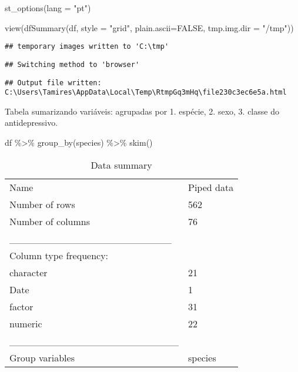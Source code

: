 \documentclass[
]{article}
\newenvironment{Shaded}{\begin{snugshade}}{\end{snugshade}}
\newcommand{\AttributeTok}[1]{\textcolor[rgb]{0.77,0.63,0.00}{#1}}
\newcommand{\ConstantTok}[1]{\textcolor[rgb]{0.00,0.00,0.00}{#1}}
\newcommand{\FunctionTok}[1]{\textcolor[rgb]{0.00,0.00,0.00}{#1}}
\newcommand{\NormalTok}[1]{#1}
\newcommand{\SpecialCharTok}[1]{\textcolor[rgb]{0.00,0.00,0.00}{#1}}
\newcommand{\StringTok}[1]{\textcolor[rgb]{0.31,0.60,0.02}{#1}}
\begin{document}
\begin{Shaded}
\begin{Highlighting}[]
\FunctionTok{st\_options}\NormalTok{(}\AttributeTok{lang =} \StringTok{"pt"}\NormalTok{)}

\FunctionTok{view}\NormalTok{(}\FunctionTok{dfSummary}\NormalTok{(df, }\AttributeTok{style =} \StringTok{"grid"}\NormalTok{, }\AttributeTok{plain.ascii=}\ConstantTok{FALSE}\NormalTok{, }\AttributeTok{tmp.img.dir =} \StringTok{"/tmp"}\NormalTok{))}
\end{Highlighting}
\end{Shaded}

\begin{verbatim}
## temporary images written to 'C:\tmp'
\end{verbatim}

\begin{verbatim}
## Switching method to 'browser'
\end{verbatim}

\begin{verbatim}
## Output file written: C:\Users\Tamires\AppData\Local\Temp\RtmpGq3mHq\file230c3ec6e5a.html
\end{verbatim}

Tabela sumarizando variáveis: agrupadas por 1. espécie, 2. sexo, 3.
classe do antidepressivo.

\begin{Shaded}
\begin{Highlighting}[]
\NormalTok{df }\SpecialCharTok{\%\textgreater{}\%} 
  \FunctionTok{group\_by}\NormalTok{(species) }\SpecialCharTok{\%\textgreater{}\%} 
  \FunctionTok{skim}\NormalTok{()}
\end{Highlighting}
\end{Shaded}

\begin{longtable}[]{@{}ll@{}}
\caption{Data summary}\tabularnewline
\toprule
\endhead
Name & Piped data \\
Number of rows & 562 \\
Number of columns & 76 \\
\_\_\_\_\_\_\_\_\_\_\_\_\_\_\_\_\_\_\_\_\_\_\_ & \\
Column type frequency: & \\
character & 21 \\
Date & 1 \\
factor & 31 \\
numeric & 22 \\
\_\_\_\_\_\_\_\_\_\_\_\_\_\_\_\_\_\_\_\_\_\_\_\_ & \\
Group variables & species \\
\bottomrule
\end{longtable}
\end{document}
